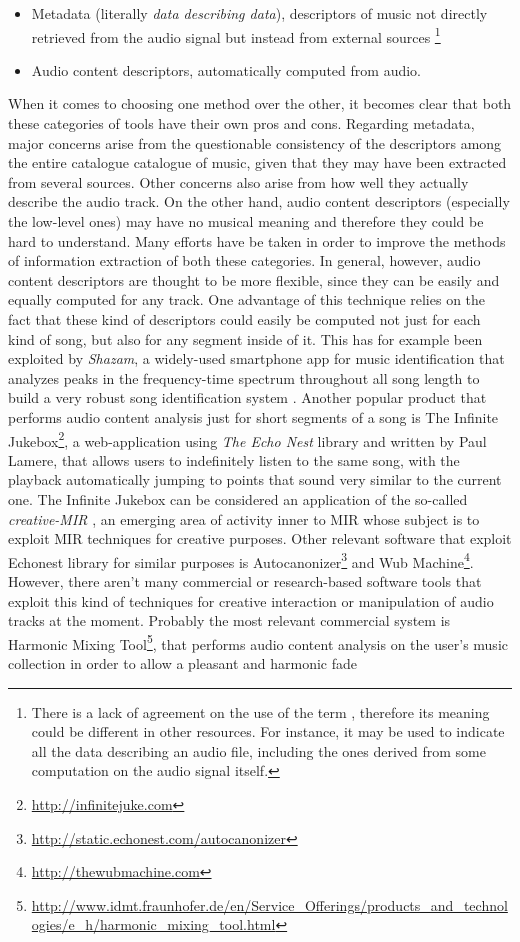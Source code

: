 \begin{itemize}
\item Metadata (literally \textit{data describing data}), descriptors of music not directly retrieved from the audio signal but instead from external sources \footnote{There is a lack of agreement on the use of the term , therefore its meaning could be different in other resources. For instance, it may be used to indicate all the data describing an audio file, including the ones derived from some computation on the audio signal itself.}
\item Audio content descriptors, automatically computed from audio.
\end{itemize}
When it comes to choosing one method over the other, it becomes clear that both these categories of tools have their own pros and cons. Regarding metadata, major concerns arise from the questionable consistency of the descriptors among the entire catalogue catalogue of music, given that they may have been extracted from several sources. Other concerns also arise from how well they actually describe the audio track. On the other hand, audio content descriptors (especially the low-level ones) may have no musical meaning and therefore they could be hard to understand. Many efforts have be taken in order to improve the methods of information extraction of both these categories. In general, however, audio content descriptors are thought to be more flexible, since they can be easily and equally computed for any track. One advantage of this technique relies on the fact that these kind of descriptors could easily be computed not just for each kind of song, but also for any segment inside of it. This has for example been exploited by \textit{Shazam}, a widely-used smartphone app for music identification that analyzes peaks in the frequency-time spectrum throughout all song length to build a very robust song identification system \cite{shazam03}. Another popular product that performs audio content analysis just for short segments of a song is The Infinite Jukebox\footnote{\url{http://infinitejuke.com}}, a web-application using \textit{The Echo Nest} library and written by Paul Lamere, that allows users to indefinitely listen to the same song, with the playback automatically jumping to points that sound very similar to the current one. The Infinite Jukebox can be considered an application of the so-called \textit{creative-MIR} \cite{xavier2013}, an emerging area of activity inner to MIR whose subject is to exploit MIR techniques for creative purposes.  Other relevant software that exploit Echonest library for similar purposes is Autocanonizer\footnote{\url{http://static.echonest.com/autocanonizer}} and Wub Machine\footnote{\url{http://thewubmachine.com}}. However, there aren't many commercial or research-based software tools that exploit this kind of techniques for creative interaction or manipulation of audio tracks at the moment. Probably the most relevant commercial system is Harmonic Mixing Tool\footnote{\url{http://www.idmt.fraunhofer.de/en/Service_Offerings/products_and_technologies/e_h/harmonic_mixing_tool.html}}, that performs audio content analysis on the user's music collection in order to allow a pleasant and harmonic fade 